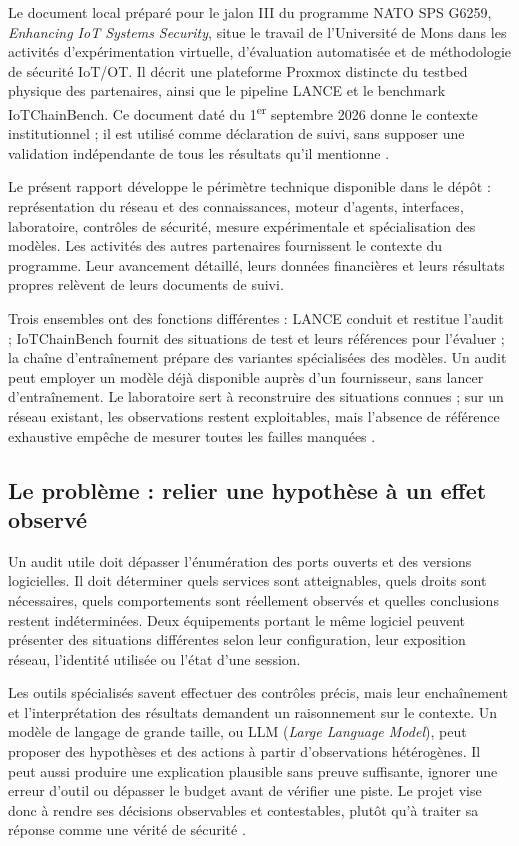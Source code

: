 \documentclass[11pt,a4paper]{article}
\begin{document}
Le document local préparé pour le jalon III du programme NATO SPS G6259,
\emph{Enhancing IoT Systems Security}, situe le travail de l'Université de Mons
dans les activités d'expérimentation virtuelle, d'évaluation automatisée et de
méthodologie de sécurité IoT/OT. Il décrit une plateforme Proxmox distincte du
testbed physique des partenaires, ainsi que le pipeline LANCE et le benchmark
IoTChainBench. Ce document daté du 1\textsuperscript{er} septembre 2026 donne le
contexte institutionnel ; il est utilisé comme déclaration de suivi, sans
supposer une validation indépendante de tous les résultats qu'il mentionne
\cite{intro-milestone}.

Le présent rapport développe le périmètre technique disponible dans le dépôt :
représentation du réseau et des connaissances, moteur d'agents, interfaces,
laboratoire, contrôles de sécurité, mesure expérimentale et spécialisation des
modèles. Les activités des autres partenaires fournissent le contexte du
programme. Leur avancement détaillé, leurs données financières et leurs
résultats propres relèvent de leurs documents de suivi.

Trois ensembles ont des fonctions différentes : LANCE conduit et restitue
l'audit ; IoTChainBench fournit des situations de test et leurs références
pour l'évaluer ; la chaîne d'entraînement prépare des variantes spécialisées
des modèles. Un audit peut employer un modèle déjà disponible auprès d'un
fournisseur, sans lancer d'entraînement. Le laboratoire sert à reconstruire
des situations connues ; sur un réseau existant, les observations restent
exploitables, mais l'absence de référence exhaustive empêche de mesurer toutes
les failles manquées \cite{intro-readme,arch-provider,sec-evaluation}.

\subsection{Le problème : relier une hypothèse à un effet observé}
Un audit utile doit dépasser l'énumération des ports ouverts et des versions
logicielles. Il doit déterminer quels services sont atteignables, quels droits
sont nécessaires, quels comportements sont réellement observés et quelles
conclusions restent indéterminées. Deux équipements portant le même logiciel
peuvent présenter des situations différentes selon leur configuration, leur
exposition réseau, l'identité utilisée ou l'état d'une session.

Les outils spécialisés savent effectuer des contrôles précis, mais leur
enchaînement et l'interprétation des résultats demandent un raisonnement sur le
contexte. Un modèle de langage de grande taille, ou LLM (\emph{Large Language
Model}), peut proposer des hypothèses et des actions à partir d'observations
hétérogènes. Il peut aussi produire une explication plausible sans preuve
suffisante, ignorer une erreur d'outil ou dépasser le budget avant de vérifier
une piste. Le projet vise donc à rendre ses décisions observables et
contestables, plutôt qu'à traiter sa réponse comme une vérité de sécurité
\cite{intro-readme,intro-protocol}.
\end{document}
